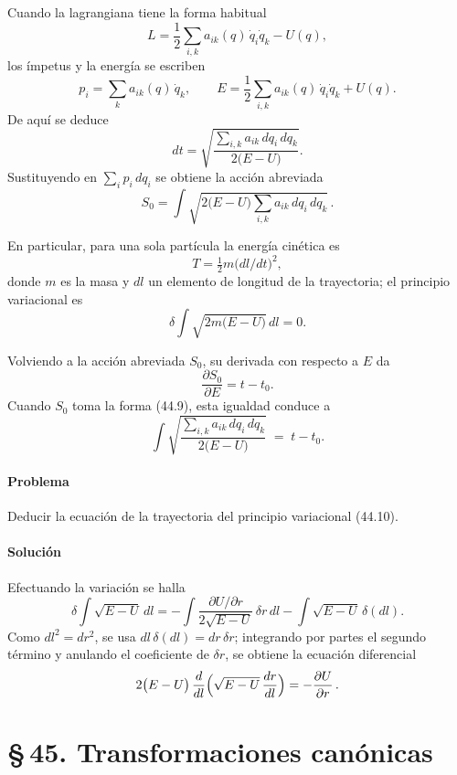 \documentclass[12pt]{article}
\begin{document}
Cuando la lagrangiana tiene la forma habitual  
\[
L=\frac12\sum_{i,k}a_{ik}(q)\,\dot q_i\dot q_k - U(q),
\]
los ímpetus y la energía se escriben
\[
p_i=\sum_k a_{ik}(q)\,\dot q_k,\qquad
E=\frac12\sum_{i,k}a_{ik}(q)\,\dot q_i\dot q_k+U(q).
\]
De aquí se deduce
\begin{equation}
dt = \sqrt{\frac{\sum_{i,k}a_{ik}\,dq_i\,dq_k}{2\bigl(E-U\bigr)}}.
\tag{44.8}
\end{equation}
Sustituyendo en \(\sum_i p_i\,dq_i\) se obtiene la acción abreviada
\begin{equation}
S_0 = \int \sqrt{2\bigl(E-U\bigr)\sum_{i,k}a_{ik}\,dq_i\,dq_k}\,.
\tag{44.9}
\end{equation}

En particular, para una sola partícula la energía cinética es  
\[
T=\tfrac12m\bigl(dl/dt\bigr)^2,
\]
donde \(m\) es la masa y \(dl\) un elemento de longitud de la trayectoria; el principio variacional es
\[
\delta\int\sqrt{2m\bigl(E-U\bigr)}\,dl = 0.
\tag{44.10}
\]

Volviendo a la acción abreviada \(S_0\), su derivada con respecto a \(E\) da
\begin{equation}
\frac{\partial S_0}{\partial E} = t - t_0.
\tag{44.11}
\end{equation}
Cuando \(S_0\) toma la forma (44.9), esta igualdad conduce a
\begin{equation}
\int\sqrt{\frac{\sum_{i,k}a_{ik}\,dq_i\,dq_k}{2\bigl(E-U\bigr)}} \;=\; t - t_0.
\tag{44.12}
\end{equation}

\paragraph*{Problema}
Deducir la ecuación de la trayectoria del principio variacional (44.10).

\paragraph*{Solución}
Efectuando la variación se halla
\[
\delta\int\sqrt{E-U}\,dl
=-\int\frac{\partial U/\partial r}{2\sqrt{E-U}}\,\delta r\,dl
-\int\sqrt{E-U}\,\delta(dl).
\]
Como \(dl^2=dr^2\), se usa \(dl\,\delta(dl)=dr\,\delta r\); integrando por partes el segundo término y anulando el coeficiente de \(\delta r\), se obtiene la ecuación diferencial
\[
2\bigl(E-U\bigr)\,\frac{d}{dl}\Bigl(\sqrt{E-U}\,\frac{dr}{dl}\Bigr)
=-\frac{\partial U}{\partial r}\,. 
\] 
\section*{\S\,45. Transformaciones canónicas}
\end{document}
